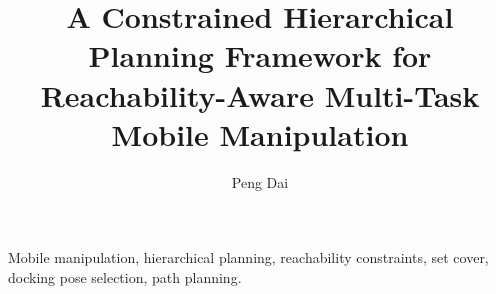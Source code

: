 \documentclass[journal]{IEEEtran}
\title{A Constrained Hierarchical Planning Framework for Reachability-Aware Multi-Task Mobile Manipulation}
\author{Peng Dai}
\begin{document}
\maketitle

\begin{abstract}

\end{abstract}

\begin{IEEEkeywords}
Mobile manipulation, hierarchical planning, reachability constraints, set cover, docking pose selection, path planning.
\end{IEEEkeywords}









% 



\end{document}
